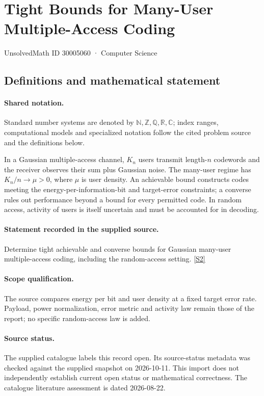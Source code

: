 \documentclass[11pt]{article}
\newcommand{\sref}[2]{\hyperlink{source:#1:#2}{[S#2]}}
\begin{document}
\setcounter{section}{30005059}
\section{Tight Bounds for Many-User Multiple-Access Coding}\label{30005060}
{\small\sffamily UnsolvedMath ID 30005060 · Computer Science}
\subsection{Definitions and mathematical statement}

\paragraph{Shared notation.}Standard number systems are denoted by $\mathbb N,\mathbb Z,\mathbb Q,\mathbb R,\mathbb C$; index ranges, computational models and specialized notation follow the cited problem source and the definitions below.


In a Gaussian multiple-access channel, $K_n$ users transmit length-$n$ codewords and the receiver observes their sum plus Gaussian noise. The many-user regime has $K_n/n\to\mu>0$, where $\mu$ is user density. An achievable bound constructs codes meeting the energy-per-information-bit and target-error constraints; a converse rules out performance beyond a bound for every permitted code. In random access, activity of users is itself uncertain and must be accounted for in decoding.
\paragraph{Statement recorded in the supplied source.}
Determine tight achievable and converse bounds for Gaussian many-user multiple-access coding, including the random-access setting. \sref{30005060}{2}
\paragraph{Scope qualification.}
The source compares energy per bit and user density at a fixed target error rate. Payload, power normalization, error metric and activity law remain those of the report; no specific random-access law is added.
\paragraph{Source status.}
The supplied catalogue labels this record open. Its source-status metadata was checked against the supplied snapshot on 2026-10-11. This import does not independently establish current open status or mathematical correctness. The catalogue literature assessment is dated 2026-08-22.
\end{document}
